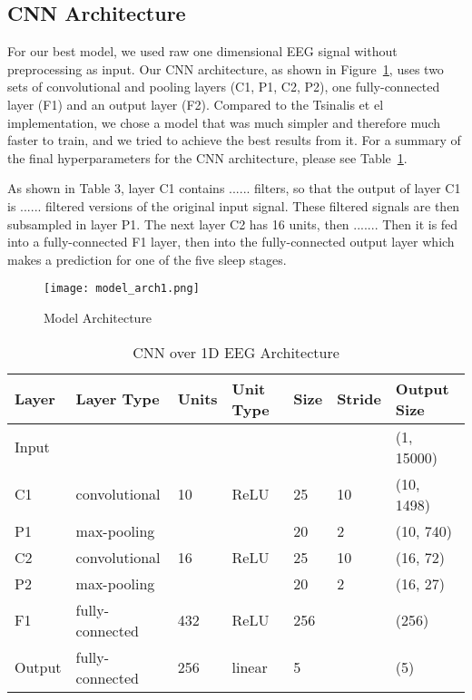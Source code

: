 \documentclass{amia}
\begin{document}
\subsection*{CNN Architecture}
For our best model, we used raw one dimensional EEG signal without preprocessing as input. Our CNN architecture, as shown in Figure~\ref{fig:figure3}, uses two sets of convolutional and pooling layers (C1, P1, C2, P2), one fully-connected layer (F1) and an output layer (F2). Compared to the Tsinalis et el implementation, we chose a model that was much simpler and therefore much faster to train, and we tried to achieve the best results from it. For a summary of the final hyperparameters for the CNN architecture, please see Table~\ref{tab:a}. 

As shown in Table 3, layer C1 contains ...... filters, so that the output of layer C1 is ...... filtered versions of the original input signal. These filtered signals are then subsampled in layer P1. The next layer C2 has 16 units, then ....... Then it is fed into a fully-connected F1 layer, then into the fully-connected output layer which makes a prediction for one of the five sleep stages. 

\begin{figure}[htb]
\begin{center}
\texttt{[image: model\_arch1.png]}
\end{center}
\caption{Model Architecture}
\label{fig:figure3}
\end{figure}


\begin{table}[h]
\centering
\caption{CNN over 1D EEG Architecture}\label{tab:a}
\begin{tabular}{| l | l | l | l | l | l | l |}
\hline
Layer & Layer Type & Units & Unit Type & Size & Stride & Output Size \\ \hline
Input & & & & & & (1, 15000) \\ \hline
C1 & convolutional & 10 & ReLU & 25 & 10 & (10, 1498)  \\ \hline
P1 & max-pooling & & & 20 & 2 & (10, 740) \\ \hline
C2 & convolutional & 16 & ReLU & 25 & 10 & (16, 72) \\ \hline
P2 & max-pooling &  &  & 20 & 2 & (16, 27) \\ \hline
F1 & fully-connected & 432 & ReLU & 256 &  & (256) \\ \hline
Output & fully-connected & 256 & linear & 5 &  & (5) \\ \hline

\end{tabular}
\end{table}
\end{document}
